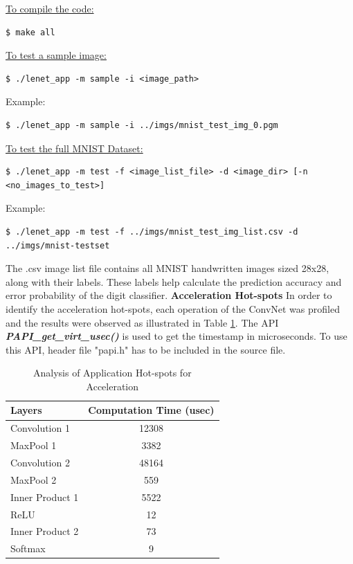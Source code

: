 \underline{To compile the code:}
\begin{scriptsize}
\linuxbash
\begin{lstlisting}
$ make all
\end{lstlisting}
\end{scriptsize}
\underline{To test a sample image:}
\begin{scriptsize}
\linuxbash
\begin{lstlisting}
$ ./lenet_app -m sample -i <image_path>
\end{lstlisting}
\end{scriptsize}
Example: 
\begin{scriptsize}
\linuxbash
\begin{lstlisting}
$ ./lenet_app -m sample -i ../imgs/mnist_test_img_0.pgm
\end{lstlisting}
\end{scriptsize}
\underline{To test the full MNIST Dataset:}
\begin{scriptsize}
\linuxbash
\begin{lstlisting}
$ ./lenet_app -m test -f <image_list_file> -d <image_dir> [-n <no_images_to_test>]
\end{lstlisting}
\end{scriptsize}
Example: 
\begin{scriptsize}
\linuxbash
\begin{lstlisting}
$ ./lenet_app -m test -f ../imgs/mnist_test_img_list.csv -d ../imgs/mnist-testset
\end{lstlisting}
\end{scriptsize}
The .csv image list file contains all MNIST handwritten images sized 28x28, along with their labels. These labels help calculate the prediction accuracy and error probability of the digit classifier.\newline
\textbf{Acceleration Hot-spots} \newline 
In order to identify the acceleration hot-spots, each operation of the ConvNet was profiled and the results were observed as illustrated in Table \ref{table:sw_hotspots}. The API \textit{\textbf{PAPI\_get\_virt\_usec()}} is used to get the timestamp in microseconds. To use this API, header file "papi.h" has to be included in the source file.
\begin{table}[htbp]
\caption{Analysis of Application Hot-spots for Acceleration}
\centering
\begin{tabular}{l c}
\toprule
Layers & Computation Time (usec)\\
\midrule
Convolution 1 &12308\\
\midrule
MaxPool 1 &3382\\
\midrule
Convolution 2 &48164\\
\midrule
MaxPool 2 &559\\
\midrule
Inner Product 1 &5522\\
\midrule
ReLU&12\\
\midrule
Inner Product 2 &73\\
\midrule
Softmax&9\\
\bottomrule
\end{tabular}
\label{table:sw_hotspots}
\end{table}
